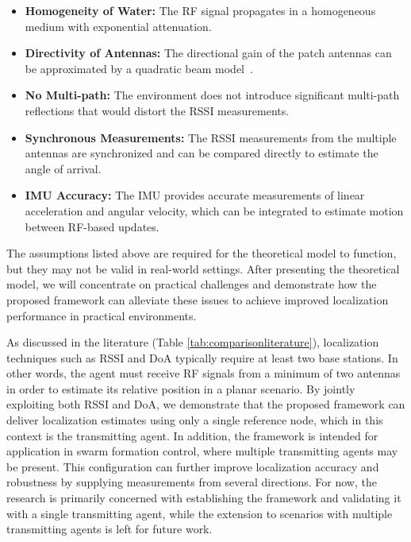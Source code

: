 \documentclass[subscriptcorrection,upint,varvw,barcolor=Goldenrod3,mathalfa=cal=euler,balance,hyphenate,pdf-a]{asmejour}
\begin{document}
\noindent
\begin{itemize}
\item \textbf{Homogeneity of Water:} The RF signal propagates in a homogeneous medium with exponential attenuation.
\item \textbf{Directivity of Antennas:} The directional gain of the patch antennas can be approximated by a quadratic beam model~\cite{Stutzman1998}.
\item \textbf{No Multi-path:} The environment does not introduce significant multi-path reflections that would distort the RSSI measurements.
\item \textbf{Synchronous Measurements:} The RSSI measurements from the multiple antennas are synchronized and can be compared directly to estimate the angle of arrival.
\item \textbf{IMU Accuracy:} The IMU provides accurate measurements of linear acceleration and angular velocity, which can be integrated to estimate motion between RF-based updates.
\end{itemize}


The assumptions listed above are required for the theoretical model to function, but they may not be valid in real-world settings. After presenting the theoretical model, we will concentrate on practical challenges and demonstrate how the proposed framework can alleviate these issues to achieve improved localization performance in practical environments.

As discussed in the literature (Table \ref{tab:comparisonliterature}), localization techniques such as RSSI and DoA typically require at least two base stations. In other words, the agent must receive RF signals from a minimum of two antennas in order to estimate its relative position in a planar scenario. By jointly exploiting both RSSI and DoA, we demonstrate that the proposed framework can deliver localization estimates using only a single reference node, which in this context is the transmitting agent. In addition, the framework is intended for application in swarm formation control, where multiple transmitting agents may be present. This configuration can further improve localization accuracy and robustness by supplying measurements from several directions. For now, the research is primarily concerned with establishing the framework and validating it with a single transmitting agent, while the extension to scenarios with multiple transmitting agents is left for future work.
\end{document}
